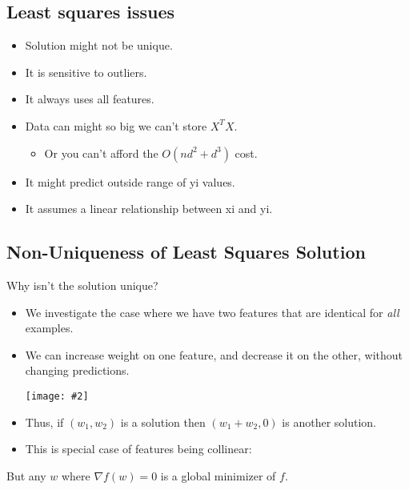 \documentclass{article}
\def\blu#1{{\color{blu}#1}}
\def\gre#1{{\color{gre}#1}}
\def\red#1{{\color{red}#1}}
\theoremstyle{definition}
\newcommand{\centerfig}[2]{\begin{center}\texttt{[image: \#2]}\end{center}}
\begin{document}
\subsection*{Least squares issues}
\begin{itemize}
	\item Solution \red{might not be unique}.
	\item It is \red{sensitive to outliers}.
	\item It always \red{uses all features}.
	\item Data can might so big we \red{can’t store $ X^TX $}.
	\begin{itemize}
		\item Or you can’t afford the $ O(nd^2 + d^3) $ cost.
	\end{itemize}
	\item It might \red{predict outside range} of yi values.
	\item It assumes a \red{linear relationship} between xi and yi.
\end{itemize}
 \subsection*{Non-Uniqueness of Least Squares Solution}
Why isn't the solution unique?
\begin{itemize}
	\item We investigate the case where we have \gre{two features that are identical} for \textit{all} examples. 
	\item We can increase weight on one feature, and decrease it on the other, \red{without changing predictions}.
	\centerfig{0.6}{Pic1}
	\item Thus, if $ (w_1,w_2) $ is a solution then $ (w_1+w_2, 0) $ is another solution.
	\item This is special case of features being \blu{collinear}:
\end{itemize}
But any $ w $ where $ \nabla f(w)=0 $ is a global minimizer of $ f $.
\end{document}
